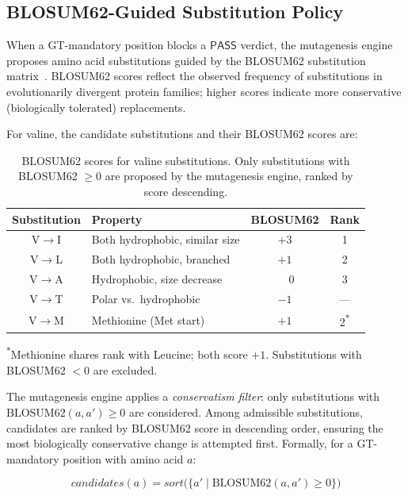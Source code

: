 \documentclass[runningheads]{llncs}
\newcommand{\PASS}{\ensuremath{\mathsf{PASS}}\xspace}
\begin{document}
\subsection{BLOSUM62-Guided Substitution Policy}

When a GT-mandatory position blocks a \PASS{} verdict, the mutagenesis engine proposes amino acid substitutions guided by the BLOSUM62 substitution matrix~\cite{henikoff1992blosum62}.
BLOSUM62 scores reflect the observed frequency of substitutions in evolutionarily divergent protein families; higher scores indicate more conservative (biologically tolerated) replacements.

For valine, the candidate substitutions and their BLOSUM62 scores are:

\begin{table}[t]
\centering
\caption{BLOSUM62 scores for valine substitutions. Only substitutions with BLOSUM62 $\ge 0$ are proposed by the mutagenesis engine, ranked by score descending.}
\label{tab:blosum}
\begin{tabular}{clcc}
\toprule
\textbf{Substitution} & \textbf{Property} & \textbf{BLOSUM62} & \textbf{Rank} \\
\midrule
V$\to$I & Both hydrophobic, similar size & $+3$ & 1 \\
V$\to$L & Both hydrophobic, branched & $+1$ & 2 \\
V$\to$A & Hydrophobic, size decrease & $\phantom{+}0$ & 3 \\
\midrule
V$\to$T & Polar vs.\ hydrophobic & $-1$ & --- \\
V$\to$M & Methionine (Met start) & $+1$ & 2\textsuperscript{*} \\
\bottomrule
\end{tabular}
\vspace{2pt}

{\scriptsize \textsuperscript{*}Methionine shares rank with Leucine; both score $+1$. Substitutions with BLOSUM62 $< 0$ are excluded.}
\end{table}

The mutagenesis engine applies a \emph{conservatism filter}: only substitutions with $\text{BLOSUM62}(a, a') \ge 0$ are considered.
Among admissible substitutions, candidates are ranked by BLOSUM62 score in descending order, ensuring the most biologically conservative change is attempted first.
Formally, for a GT-mandatory position with amino acid $a$:

\begin{equation}\label{eq:mutrank}
\mathit{candidates}(a) = \mathit{sort}\!\bigl(\{a' \mid \text{BLOSUM62}(a, a') \ge 0 \}\bigr)
\end{equation}
\end{document}
